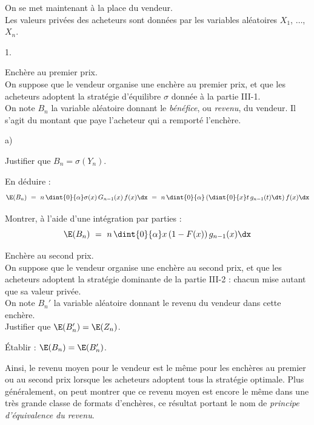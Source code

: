\documentclass[11pt]{article}%
\begin{document}
\noindent
On se met maintenant à la place du vendeur.\\
Les valeurs privées des acheteurs sont données par les variables 
aléatoires $X_1$, $\ldots$, $X_n$.
\begin{noliste}{1.}
  \setlength{\itemsep}{4mm}
  \setcounter{enumi}{12}
  \item Enchère au premier prix.\\
  On suppose que le vendeur organise une enchère au premier prix, et 
  que les acheteurs adoptent la stratégie d'équilibre $\sigma$ donnée
  à la partie III-1.\\
  On note $B_n$ la variable aléatoire donnant le \emph{bénéfice}, ou 
  \emph{revenu}, du vendeur. Il s'agit du montant que paye l'acheteur
  qui a remporté l'enchère.
  \begin{noliste}{a)}
    \setlength{\itemsep}{2mm}
    \item Justifier que $B_n = \sigma(Y_n)$.
    
    
    
    

    
    \item En déduire :
    \[
      \E(B_n) \ = \ n \, \dint{0}{\alpha} \sigma(x) \, G_{n-1}(x) \,
      f(x) \dx \ = \ n \, \dint{0}{\alpha} \left( \dint{0}{x} t \, 
      g_{n-1}(t) \dt \right) f(x) \dx
    \]
    
    

    
    \item Montrer, à l'aide d'une intégration par parties :
    \[
      \E(B_n) \ = \ n \, \dint{0}{\alpha} x \, (1-F(x)) \, 
      g_{n-1}(x) \dx
    \]
    
    
  \end{noliste}
  
  \item Enchère au second prix.\\
  On suppose que le vendeur organise une enchère au second prix, et que 
  les acheteurs adoptent la stratégie dominante de la partie III-2 : 
  chacun mise autant que sa valeur privée.\\
  On note $B_n'$ la variable aléatoire donnant le revenu du vendeur 
  dans cette enchère.\\
  Justifier que $\E(B_n') = \E(Z_n)$.
  
  

  
  \item Établir : $\E(B_n) = \E(B_n')$.
  
  
\end{noliste}
Ainsi, le revenu moyen pour le vendeur est le même pour les enchères au 
premier ou au second prix lorsque les acheteurs adoptent tous la 
stratégie optimale. Plus généralement, on peut montrer que ce revenu 
moyen est encore le même dans une très grande classe de formats 
d'enchères, ce résultat portant le nom de \emph{principe d'équivalence 
du revenu}.
\end{document}
